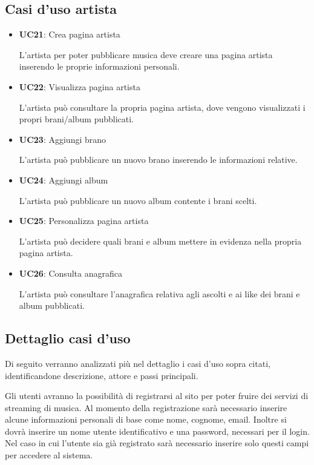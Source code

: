 \subsection{Casi d'uso artista}
\begin{itemize}
      \item \textbf{UC21}: Crea pagina artista 
      
      L'artista per poter pubblicare musica deve
            creare una pagina artista inserendo le proprie informazioni personali.
      \item  \textbf{UC22}: Visualizza pagina artista 
      
      L'artista può consultare la propria
            pagina artista, dove vengono visualizzati i propri brani/album pubblicati.
      \item  \textbf{UC23}: Aggiungi brano 
      
      L'artista può pubblicare un nuovo brano
            inserendo le informazioni relative.
      \item  \textbf{UC24}: Aggiungi album 
      
      L'artista può pubblicare un nuovo album contente
            i brani scelti.
      \item  \textbf{UC25}: Personalizza pagina artista 
      
      L'artista può decidere quali brani
            e album mettere in evidenza nella propria pagina artista.
      \item  \textbf{UC26}: Consulta anagrafica 
      
      L'artista può consultare l'anagrafica
            relativa agli ascolti e ai like dei brani e album pubblicati.

\end{itemize}


\vspace{1cm}
\subsection{Dettaglio casi d'uso}
Di seguito verranno analizzati più nel dettaglio i casi d’uso sopra citati, identificandone descrizione, attore e passi principali.

Gli utenti avranno la possibilità di registrarsi al sito per poter fruire dei servizi di streaming di musica. Al momento della registrazione sarà necessario inserire alcune informazioni personali di base come nome, cognome, email. Inoltre si dovrà inserire un nome utente identificativo e una password, necessari per il login. Nel caso in cui l’utente sia già registrato sarà necessario inserire solo questi campi per accedere al sistema. 


